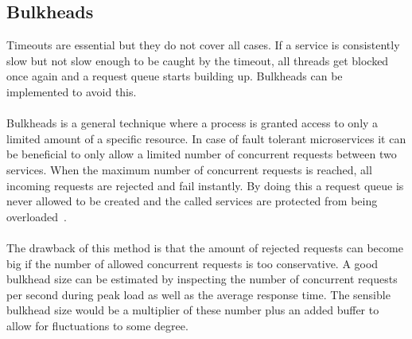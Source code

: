 \subsection{Bulkheads}
Timeouts are essential but they do not cover all cases. If a service
is consistently slow but not slow enough to be caught by the timeout,
all threads get blocked once again and a request queue starts building
up. Bulkheads can be implemented to avoid this.
\\\\
Bulkheads is a general technique where a process is granted access to
only a limited amount of a specific resource. In case of
fault tolerant microservices it can be beneficial to only allow a
limited number of concurrent requests between two services. When the
maximum number of concurrent requests is reached, all incoming
requests are rejected and fail instantly. By doing this a request
queue is never allowed to be created and the called services are
protected from being overloaded~\cite{avanza}.
\\\\
The drawback of this method is that the amount of rejected requests
can become big if the number of allowed concurrent requests is too
conservative. A good bulkhead size can be estimated by inspecting the
number of concurrent requests per second during peak load as well as
the average response time. The sensible bulkhead size would be a
multiplier of these number plus an added buffer to allow for
fluctuations to some degree.

